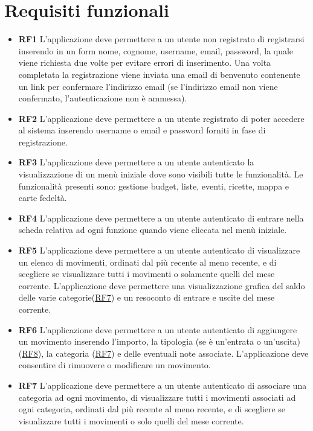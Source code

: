 \documentclass[a4paper,12pt]{article}
\begin{document}
\section*{Requisiti funzionali}
\begin{itemize} \setlength\itemsep{0.01em}
\item \textbf {\hypertarget{RF1}{RF1}} L'applicazione deve permettere a un utente non registrato di registrarsi inserendo in un form nome, cognome, username, email, password, la quale viene richiesta due volte per evitare errori di inserimento. Una volta completata la registrazione viene inviata una email di benvenuto contenente un link per confermare l'indirizzo email (se l'indirizzo email non viene confermato, l'autenticazione non è ammessa).
\item \textbf {\hypertarget{RF2}{RF2}} L'applicazione deve permettere a un utente registrato di poter accedere al sistema inserendo username o email e password forniti in fase di registrazione.
\item \textbf {\hypertarget{RF3}{RF3}} L'applicazione deve permettere a un utente autenticato la visualizzazione di un menù iniziale dove sono visibili tutte le funzionalità. Le funzionalità presenti sono: gestione budget, liste, eventi, ricette, mappa e carte fedeltà.
\item \textbf {\hypertarget{RF4}{RF4}} L'applicazione deve permettere a un utente autenticato di entrare nella scheda relativa ad ogni funzione quando viene cliccata nel menù iniziale.
\item \textbf {\hypertarget{RF5}{RF5}} L'applicazione deve permettere a un utente autenticato di visualizzare un elenco di movimenti, ordinati dal più recente al meno recente, e di scegliere se visualizzare tutti i movimenti o solamente quelli del mese corrente. L'applicazione deve permettere una visualizzazione grafica del saldo delle varie categorie(\hyperlink{RF7}{RF7}) e un resoconto di entrare e uscite del mese corrente.
\item \textbf {\hypertarget{RF6}{RF6}} L'applicazione deve permettere a un utente autenticato di aggiungere un movimento inserendo l'importo, la tipologia (se è un'entrata o un'uscita) (\hyperlink{RF8}{RF8}), la categoria (\hyperlink{RF7}{RF7}) e delle eventuali note associate. L'applicazione deve consentire di rimuovere o modificare un movimento.
\item \textbf {\hypertarget{RF7}{RF7}} L'applicazione deve permettere a un utente autenticato di associare una categoria ad ogni movimento, di visualizzare tutti i movimenti associati ad ogni categoria, ordinati dal più recente al meno recente, e di scegliere se visualizzare tutti i movimenti o solo quelli del mese corrente.

\end{itemize}
\end{document}
